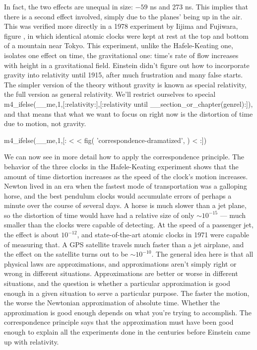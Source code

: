 In fact, the two effects are unequal in size: $-59$ ns and 273 ns. This
implies that there is a second effect involved, simply due to the planes' being up in the air.
This was verified more directly in a 1978 experiment by Iijima and Fujiwara, figure , in which identical atomic
clocks were kept at rest at the top and bottom of a mountain near Tokyo.
This experiment, unlike the Hafele-Keating one, isolates one effect on time, the gravitational one: time's
rate of flow increases with height in a gravitational field. Einstein didn't figure out
how to incorporate gravity into relativity until 1915, after much frustration and many false starts. The
simpler version of the theory without gravity is known as special relativity, the full version as general
relativity. We'll restrict ourselves to 
special m4_ifelse(__me,1,[:relativity:],[:relativity until __section_or_chapter(genrel):]), and
that means that what we want to
focus on right now is the distortion of time due to motion, not gravity.\label{iijima}


m4_ifelse(__me,1,[: %
<%
<%
  fig(
    'correspondence-dramatized',
  )
<%
:]) %

We can now see in more detail how to apply the correspondence principle. The behavior of the three clocks in the
Hafele-Keating experiment shows that the amount of time distortion increases as the speed of the clock's motion
increases. Newton lived in an era when the fastest
mode of transportation was a galloping horse, and the best
pendulum clocks would accumulate errors of perhaps a minute over the course of several days.
A horse is much slower than a jet plane, so the
distortion of time would have had a relative size of only $\sim10^{-15}$ --- much smaller than the clocks were capable of detecting.
At the speed of a passenger jet, the effect is about $10^{-12}$,
and state-of-the-art atomic clocks in 1971 were capable of measuring that.
A GPS satellite travels much faster than a jet airplane, and the effect on the satellite
turns out to be $\sim10^{-10}$. The general idea here is that all physical laws are approximations, and
approximations aren't simply right or wrong in different situations. Approximations are better or worse
in different situations, and the question is whether a particular approximation is good enough in a given
situation to serve a particular purpose. The faster the motion, the worse the Newtonian approximation of
absolute time. Whether the approximation is good enough depends on what you're trying to accomplish.
The correspondence principle says that the approximation must have been good enough to explain
all the experiments done in the centuries before Einstein came up with relativity.

